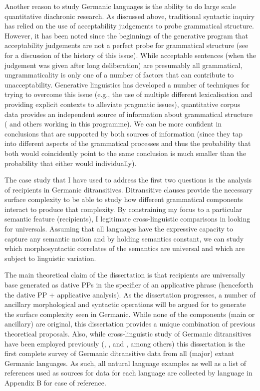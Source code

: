 Another reason to study Germanic languages is the ability to do large scale quantitative diachronic research. As discussed above, traditional syntactic inquiry has relied on the use of acceptability judgements to probe grammatical structure. However, it has been noted since the beginnings of the generative program that acceptability judgements are not a perfect probe for grammatical structure (see \citealt{Schutze.1996} for a discussion of the history of this issue). While acceptable sentences (when the judgement was given after long deliberation) are presumably all grammatical, ungrammaticality is only one of a number of factors that can contribute to unacceptability. Generative linguistics has developed a number of techniques for trying to overcome this issue (e.g., the use of multiple different lexicalisation and providing explicit contexts to alleviate pragmatic issues), quantitative corpus data provides an independent source of information about grammatical structure (\citealt{Kroch.1989,Kroch.1994} and others working in this programme). We can be more confident in conclusions that are supported by both sources of information (since they tap into different aspects of the grammatical processes and thus the probability that both would coincidently point to the same conclusion is much smaller than the probability that either would individually).

The case study that I have used to address the first two questions is the analysis of recipients in Germanic ditransitives. Ditransitive clauses provide the necessary surface complexity to be able to study how different grammatical components interact to produce that complexity. By constraining my focus to a particular semantic feature (recipients), I legitimate cross-linguistic comparisons in looking for universals. Assuming that all languages have the expressive capacity to capture any semantic notion and by holding semantics constant, we can study which morphosyntactic correlates of the semantics are universal and which are subject to linguistic variation.

The main theoretical claim of the dissertation is that recipients are universally base generated as dative PPs in the specifier of an applicative phrase (henceforth the dative PP + applicative analysis). As the dissertation progresses, a number of ancillary morphological and syntactic operations will be argued for to generate the surface complexity seen in Germanic. While none of the components (main or ancillary) are original, this dissertation provides a unique combination of previous theoretical proposals. Also, while cross-linguistic study of Germanic ditransitives have been employed previously (\citealt{Falk.1990}, \citealt{Sprouse.1995}, and \citealt{Holmberg.1995}, among others) this dissertation is the first complete survey of Germanic ditransitive data from all (major) extant Germanic languages. As such, all natural language examples as well as a list of references used as sources for data for each language are collected by language in Appendix B for ease of reference.


